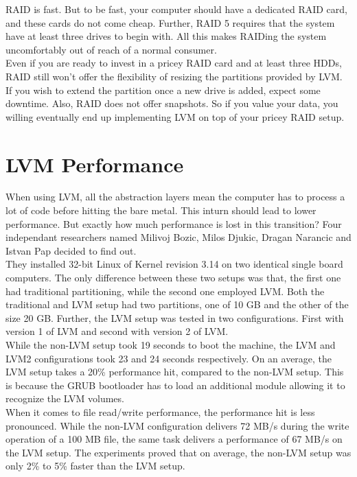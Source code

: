RAID is fast. But to be fast, your computer should have a dedicated RAID card,
and these cards do not come cheap. Further, RAID 5 requires that the system have
at least three drives to begin with. All this makes RAIDing the system
uncomfortably out of reach of a normal consumer.\\

Even if you are ready to invest in a pricey RAID card and at least three HDDs,
RAID still won't offer the flexibility of resizing the partitions provided by
LVM. If you wish to extend the partition once a new drive is added, expect some
downtime. Also, RAID does not offer snapshots. So if you value your data, you
willing eventually end up implementing LVM on top of your pricey RAID setup.


\chapter{LVM Performance}
When using LVM, all the abstraction layers mean the computer has to process a
lot of code before hitting the bare metal. This inturn should lead to lower
performance. But exactly how much performance is lost in this transition? Four
independant researchers named Milivoj Bozic, Milos Djukic, Dragan Narancic and
Istvan Pap decided to find out.\\

They installed 32-bit Linux of Kernel revision 3.14 on two identical single
board computers. The only difference between these two setups was that, the
first one had traditional partitioning, while the second one employed LVM. Both
the traditional and LVM setup had two partitions, one of 10 GB and the other
of the size 20 GB. Further, the LVM setup was tested in two configurations.
First with version 1 of LVM and second with version 2 of LVM.\\

While the non-LVM setup took 19 seconds to boot the machine, the LVM and LVM2
configurations took 23 and 24 seconds respectively. On an average, the LVM
setup takes a 20\% performance hit, compared to the non-LVM setup. This is
because the GRUB bootloader has to load an additional module allowing it to
recognize the LVM volumes.\\

When it comes to file read/write performance, the performance hit is less
pronounced. While the non-LVM configuration delivers 72 MB/s during the write
operation of a 100 MB file, the same task delivers a performance of 67 MB/s on
the LVM setup. The experiments proved that on average, the non-LVM setup was
only 2\% to 5\% faster than the LVM setup.
